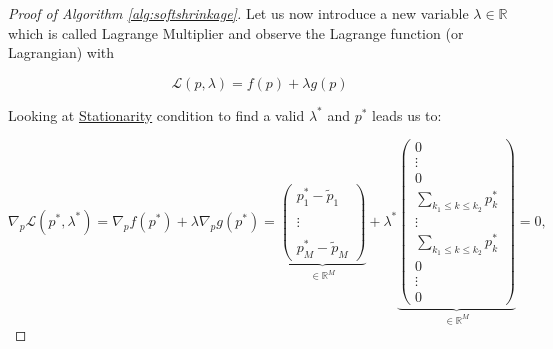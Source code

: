 \begin{proof}[Proof of Algorithm \ref{alg:softshrinkage}]
        Let us now introduce a new variable $\lambda \in \mathbb{R}$ which is called Lagrange Multiplier and observe the Lagrange function (or Lagrangian) with



        \begin{equation}
            \mathcal{L}(p, \lambda) = f(p) + \lambda g(p)%
        \end{equation}

        Looking at \underline{Stationarity} condition to find a valid $\lambda^{\ast}$ and $p^{\ast}$ leads us to:

        \begin{equation}
            \nabla_{p} \mathcal{L}(p^{\ast}, \lambda^{\ast}) = \nabla_{p} f(p^{\ast}) + \lambda \nabla_{p} g(p^{\ast}) =
            \underbrace{\begin{pmatrix}
                p^{\ast}_{1} - \tilde{p}_{1} \\
                 \\
                \vdots \\
                 \\
                p^{\ast}_{M} - \tilde{p}_{M}
            \end{pmatrix}}_{\in \mathbb{R}^{M}}
            + \lambda^{\ast}
            \underbrace{\begin{pmatrix}
                0 \\
                \vdots \\
                0 \\
                \sum\limits_{k_{1} \le k \le k_{2}} p^{\ast}_{k} \\
                \vdots \\
                \sum\limits_{k_{1} \le k \le k_{2}} p^{\ast}_{k} \\
                0 \\
                \vdots \\
                0
            \end{pmatrix}}_{\in \mathbb{R}^{M}}
            = 0,
        \end{equation}


\end{proof}
